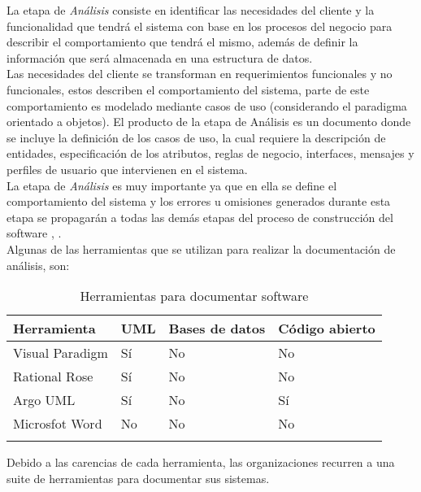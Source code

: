 La etapa de {\it Análisis} consiste en identificar las necesidades del cliente y la funcionalidad que tendrá el sistema con base en los procesos del negocio para describir el comportamiento que tendrá el mismo, además de definir la información que será almacenada en una estructura de datos. \\

Las necesidades del cliente se transforman en requerimientos funcionales y no funcionales, estos describen el comportamiento del sistema, parte de este comportamiento es modelado mediante casos de uso (considerando el paradigma orientado a objetos). El producto de la etapa de Análisis es un documento donde se incluye la definición de los casos de uso, la cual requiere la descripción de entidades, especificación de los atributos,  reglas de negocio, interfaces, mensajes y perfiles de usuario que intervienen en el sistema.\\

La etapa de {\it Análisis} es muy importante ya que en ella se define el comportamiento del sistema y los errores u omisiones generados durante esta etapa se propagarán a todas las demás etapas del proceso de construcción del software \cite{sommerville1992software}, \cite{kendall2005analisis}.\\


Algunas de las herramientas que se utilizan para realizar la documentación de análisis, son:

\begin{longtable}{| p{} | p{} | p{} | p{} |}%
	\arrayrulecolor{black}%
	\rowcolor{black}%
	{\color{white}Herramienta} & {\color{white}UML} & {\color{white}Bases de datos} & {\color{white}Código abierto}\\ \hline
	\endhead%
	\arrayrulecolor{black}%
	Visual Paradigm & Sí & No & No\\ \hline
	Rational Rose & Sí & No & No\\ \hline
	Argo UML &  Sí & No & Sí\\ \hline
	Microsfot Word &  No & No & No\\ \hline
	\caption{Herramientas para documentar software}\label{fig:tablaAnalisis}
\end{longtable}%


Debido a las carencias de cada herramienta, las organizaciones recurren a una suite de herramientas para documentar sus sistemas. 




